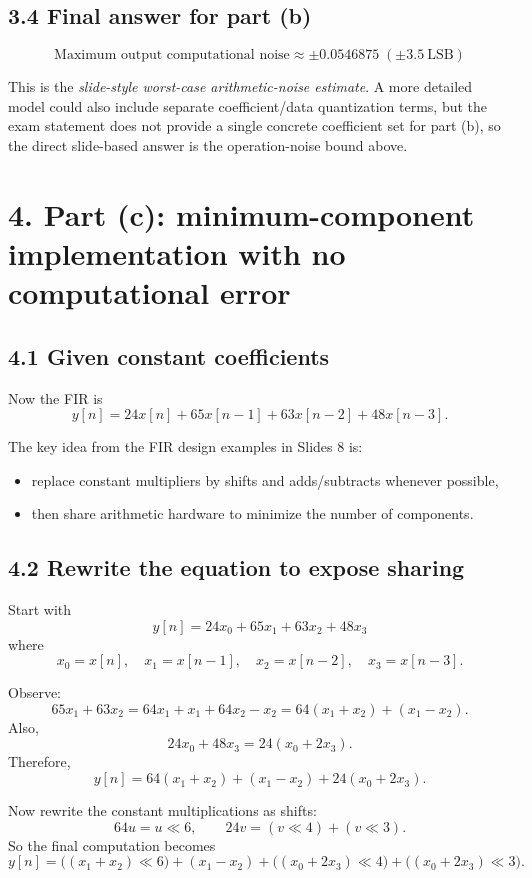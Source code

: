 \documentclass[11pt,a4paper]{article}
\begin{document}
\subsection*{3.4 Final answer for part (b)}
\[
\boxed{\text{Maximum output computational noise} \approx \pm 0.0546875\;(\pm 3.5\ \text{LSB})}
\]

\noindent
This is the \emph{slide-style worst-case arithmetic-noise estimate}. A more detailed model could also include separate coefficient/data quantization terms, but the exam statement does not provide a single concrete coefficient set for part (b), so the direct slide-based answer is the operation-noise bound above.

\section*{4. Part (c): minimum-component implementation with no computational error}
\subsection*{4.1 Given constant coefficients}
Now the FIR is
\[
y[n]=24x[n]+65x[n-1]+63x[n-2]+48x[n-3].
\]

The key idea from the FIR design examples in Slides 8 is:
\begin{itemize}
  \item replace constant multipliers by shifts and adds/subtracts whenever possible,
  \item then share arithmetic hardware to minimize the number of components.
\end{itemize}

\subsection*{4.2 Rewrite the equation to expose sharing}
Start with
\[
y[n]=24x_0+65x_1+63x_2+48x_3
\]
where
\[
x_0=x[n],\quad x_1=x[n-1],\quad x_2=x[n-2],\quad x_3=x[n-3].
\]

Observe:
\[
65x_1+63x_2=64x_1+x_1+64x_2-x_2=64(x_1+x_2)+(x_1-x_2).
\]
Also,
\[
24x_0+48x_3=24(x_0+2x_3).
\]
Therefore,
\[
\boxed{y[n]=64(x_1+x_2)+(x_1-x_2)+24(x_0+2x_3)}.
\]

Now rewrite the constant multiplications as shifts:
\[
64u=u\ll 6,\qquad 24v=(v\ll 4)+(v\ll 3).
\]
So the final computation becomes
\[
\boxed{
y[n]=\big((x_1+x_2)\ll 6\big)+(x_1-x_2)+\big((x_0+2x_3)\ll 4\big)+\big((x_0+2x_3)\ll 3\big).
}
\]
\end{document}
